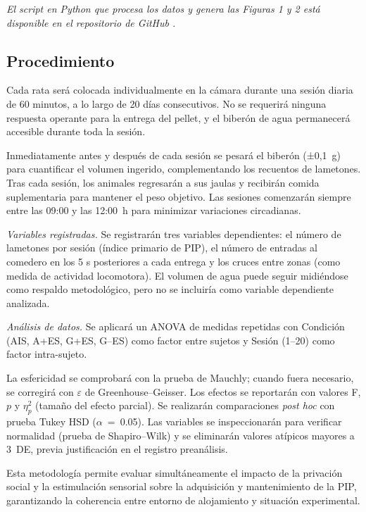 \documentclass[12pt,a4paper]{article}
\begin{document}
\begin{multicols}{2}
\textit{El script en Python que procesa los datos y genera las Figuras 1 y 2 está disponible en el repositorio de GitHub \citep{Pena2025}.
}

\subsection*{Procedimiento}

Cada rata será colocada individualmente en la cámara durante una sesión diaria de 60 minutos, a lo largo de 20 días consecutivos. No se requerirá ninguna respuesta operante para la entrega del pellet, y el biberón de agua permanecerá accesible durante toda la sesión.

Inmediatamente antes y después de cada sesión se pesará el biberón (±0,1~g) para cuantificar el volumen ingerido, complementando los recuentos de lametones. Tras cada sesión, los animales regresarán a sus jaulas y recibirán comida suplementaria para mantener el peso objetivo. Las sesiones comenzarán siempre entre las 09:00 y las 12:00~h para minimizar variaciones circadianas.

\textit{Variables registradas.} Se registrarán tres variables dependientes: el número de lametones por sesión (índice primario de PIP), el número de entradas al comedero en los 5 s posteriores a cada entrega y los cruces entre zonas (como medida de actividad locomotora). El volumen de agua puede seguir midiéndose como respaldo metodológico, pero no se incluiría como variable dependiente analizada.


\textit{Análisis de datos.} Se aplicará un ANOVA de medidas repetidas con Condición (AIS, A+ES, G+ES, G--ES) como factor entre sujetos y Sesión (1–20) como factor intra-sujeto.

La esfericidad se comprobará con la prueba de Mauchly; cuando fuera necesario, se corregirá con $\varepsilon$ de Greenhouse–Geisser. Los efectos se reportarán con valores F, $p$ y $\eta^2_p$ (tamaño del efecto parcial). Se realizarán comparaciones \textit{post hoc} con prueba Tukey HSD ($\alpha$~=~0.05). Las variables se inspeccionarán para verificar normalidad (prueba de Shapiro--Wilk) y se eliminarán valores atípicos mayores a $3$~DE, previa justificación en el registro preanálisis.


\vspace{2mm}
Esta metodología permite evaluar simultáneamente el impacto de la privación social y la estimulación sensorial sobre la adquisición y mantenimiento de la PIP, garantizando la coherencia entre entorno de alojamiento y situación experimental.




\end{multicols}
\end{document}
